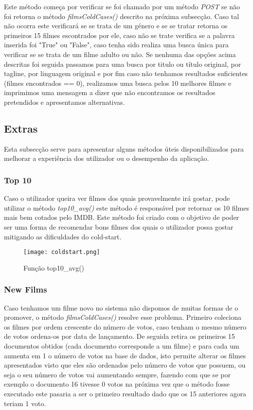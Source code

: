 Este método começa por verificar se foi chamado por um método \textit{POST} se não foi retorna o método \textit{filmsColdCases()} descrito na próxima subsecção. Caso tal não ocorra este verificará se se trata de um género e se se tratar retorna os primeiros 15 filmes escontrados por ele, caso não se trate verifica se a palavra inserida foi "True" ou "False", caso tenha sido realiza uma busca única para verificar se se trata de um filme adulto ou não. Se nenhuma das opções acima descritas foi seguida passamos para uma busca por titulo ou título original, por tagline, por linguagem original e por fim caso não tenhamos resultados suficientes (filmes encontrados == 0), realizamos uma busca pelos 10 melhores filmes e imprimimos uma mensagem a dizer que não encontramos os resultados pretendidos e apresentamos alternativas. 


\subsection{Extras}

Esta subsecção serve para apresentar alguns métodos úteis disponibilizados para melhorar a experiência dos utilizador ou o desempenho da aplicação. 

\subsubsection{Top 10}

\par Caso o utilizador queira ver filmes dos quais provavelmente irá gostar, pode utilizar o método \textit{top10\_avg()} este método é responsável por retornar os 10 filmes mais bem cotados pelo IMDB. Este método foi criado com o objetivo de poder ser uma forma de recomendar bons filmes dos quais o utilizador possa gostar mitigando as dificuldades do cold-start.

\begin{figure}[H]
\centering
\texttt{[image: coldstart.png]}
\caption {Função top10\_avg()}
\label {fig04}
\end{figure}

\subsubsection{New Films}

\par Caso tenhamos um filme novo no sistema não dispomos de muitas formas de o promover, o método \textit{filmsColdCases()} resolve esse problema. Primeiro coleciona os filmes por ordem crescente do número de votos, caso tenham o mesmo número de votos ordena-os por data de lançamento. De seguida retira os primeiros 15 documentos obtidos (cada documento corresponde a um filme) e para cada um aumenta em 1 o número de votos na base de dados, isto permite alterar os filmes apresentados visto que eles são ordenados pelo número de votos que possuem, ou seja o seu número de votos vai aumentando sempre, fazendo com que se por exemplo o documento 16 tivesse 0 votos na próxima vez que o método fosse executado este pasaria a ser o primeiro resultado  dado que os 15 anteriores agora teriam 1 voto.

